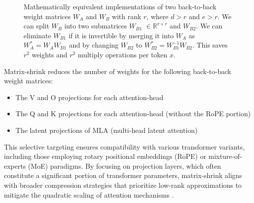 \documentclass{article}
\begin{document}
\begin{figure}[h]
\centering
\caption{Mathematically equivalent implementations of two back-to-back weight matrices $W_A$ and $W_B$ with rank $r$, where $d > r$ and $e > r$. We can split $W_B$ into two submatrices $W_{B1}$ $\in \mathbb{R}^{r \times r}$ and $W_{B2}$. We can eliminate $W_{B1}$ if it is invertible by merging it into $W_A$ as $W^{*}_{A} = W_A W_{B1}$ and by changing $W_{B2}$ to $W^{*}_{B2} = W^{-1}_{B1} W_{B2}$. This saves $r^2$ weights and $r^{2}$ multiply operations per token $x$.}
\label{fig:fig1}
\end{figure}

Matrix-shrink reduces the number of weights for the following back-to-back weight matrices:

\begin{itemize}
\item The V and O projections for each attention-head
\item The Q and K projections for each attention-head (without the RoPE portion)
\item The latent projections of MLA (multi-head latent attention)
\end{itemize}

This selective targeting ensures compatibility with various transformer variants, including those employing rotary positional embeddings (RoPE) or mixture-of-experts (MoE) paradigms. By focusing on projection layers, which often constitute a significant portion of transformer parameters, matrix-shrink aligns with broader compression strategies that prioritize low-rank approximations to mitigate the quadratic scaling of attention mechanisms \cite{arxiv2024lowrank}.
\end{document}
